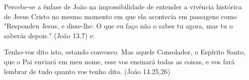 \documentclass[
    article,            %
	12pt,				%
	oneside,			%
	a4paper,			%
	chapter=TITLE,		%
	section=TITLE,		%
	english,			%
	french,				%
	spanish,			%
	brazil				%
	]{abntex2}
\begin{document}



\imprimircapa

\imprimirfolhaderosto


\textual
\pagestyle{simple}



Percebe-se a ênfase de João na impossibilidade de entender a vivência histórica de Jesus Cristo no mesmo momento em que ela acontecia em passagens como "Respondeu Jesus, e disse-lhe: O que eu faço não o sabes tu agora, mas tu o saberás depois." (João 13.7) e:
\begin{citacao}
Tenho-vos dito isto, estando convosco. Mas aquele Consolador, o Espírito Santo, que o Pai enviará em meu nome, esse vos ensinará todas as coisas, e vos fará lembrar de tudo quanto vos tenho dito. (João 14.25,26)
\end{citacao}
\end{document}
